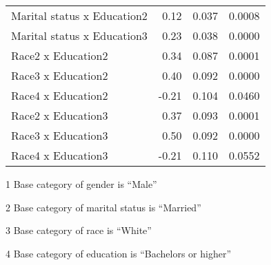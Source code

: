 \begin{table}[H]
\begin{threeparttable}
\begin{tabular}{lrrr}
  Marital status x Education2 & 0.12 & 0.037 & 0.0008 \\ 
  Marital status x Education3 & 0.23 & 0.038 & 0.0000 \\ 
  Race2 x Education2 & 0.34 & 0.087 & 0.0001 \\ 
  Race3 x Education2 & 0.40 & 0.092 & 0.0000 \\ 
  Race4 x Education2 & -0.21 & 0.104 & 0.0460 \\ 
  Race2 x Education3 & 0.37 & 0.093 & 0.0001 \\ 
  Race3 x Education3 & 0.50 & 0.092 & 0.0000 \\ 
  Race4 x Education3 & -0.21 & 0.110 & 0.0552 \\ 
  \hline
\end{tabular}
\begin{tablenotes}\tiny
\item[1] Base category of gender is ``Male''
\item[2] Base category of marital status is ``Married''
\item[3] Base category of race is ``White''
\item[4] Base category of education is ``Bachelors or higher''
\end{tablenotes}
\end{threeparttable}

\label{tab:Table2Reg}
\end{table}

